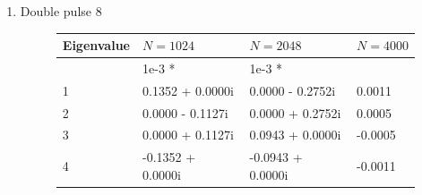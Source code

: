 \documentclass[12pt]{article}
\begin{document}
\begin{enumerate}
\item Double pulse 8
\begin{figure}[H]
\begin{tabular}{l|lll}
Eigenvalue & $N = 1024$ & $N = 2048$  & $N = 4000$\\ \hline
           &   1e-3 *           &   1e-3 *            &                   \\
1          &   0.1352 + 0.0000i &   0.0000 - 0.2752i  &      0.0011 \\
2          &   0.0000 - 0.1127i &   0.0000 + 0.2752i  &      0.0005 \\
3          &   0.0000 + 0.1127i &   0.0943 + 0.0000i  &     -0.0005 \\
4          &  -0.1352 + 0.0000i &  -0.0943 + 0.0000i  &     -0.0011 \\       
\end{tabular}
\end{figure}

\end{enumerate}
\end{document}
